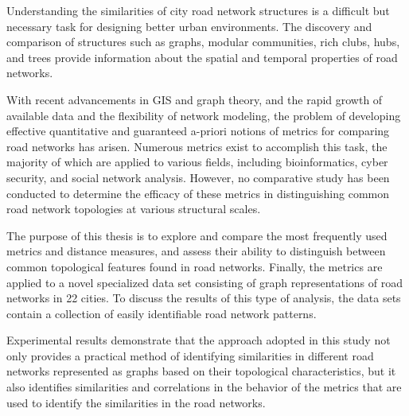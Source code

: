 
Understanding the similarities of city road network structures is a difficult but necessary task for designing better urban environments. The discovery and comparison of structures such as graphs, modular communities, rich clubs, hubs, and trees provide information about the spatial and temporal properties of road networks.

With recent advancements in GIS and graph theory, and the rapid growth of available data and the flexibility of network modeling, the problem of developing effective quantitative and guaranteed a-priori notions of metrics for comparing road networks has arisen. Numerous metrics exist to accomplish this task, the majority of which are applied to various fields, including bioinformatics, cyber security, and social network analysis. However, no comparative study has been conducted to determine the efficacy of these metrics in distinguishing common road network topologies at various structural scales.

The purpose of this thesis is to explore and compare the most frequently used metrics and distance measures, and assess their ability to distinguish between common topological features found in road networks. Finally, the metrics are applied to a novel specialized data set consisting of graph representations of road networks in 22 cities. To discuss the results of this type of analysis, the data sets contain a collection of easily identifiable road network patterns.

Experimental results demonstrate that the approach adopted in this study not only provides a practical method of identifying similarities in different road networks represented as graphs based on their topological characteristics, but it also identifies similarities and correlations in the behavior of the metrics that are used to identify the similarities in the road networks.
